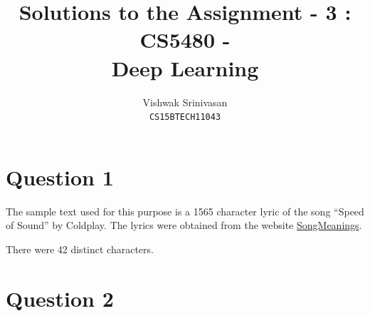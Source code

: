 \documentclass{article}
\title{Solutions to the Assignment - 3 : CS5480 - \\
Deep Learning}
\author{Vishwak Srinivasan\\
\texttt{CS15BTECH11043}}
\date{}
\begin{document}
\maketitle

\section*{Question 1}
\begin{flushleft}
The sample text used for this purpose is a 1565 character lyric of the song ``Speed of Sound'' by Coldplay. The lyrics were obtained from the website \href{https://songmeanings.com}{SongMeanings}.

There were 42 distinct characters.
\end{flushleft}

\section*{Question 2}
\end{document}
